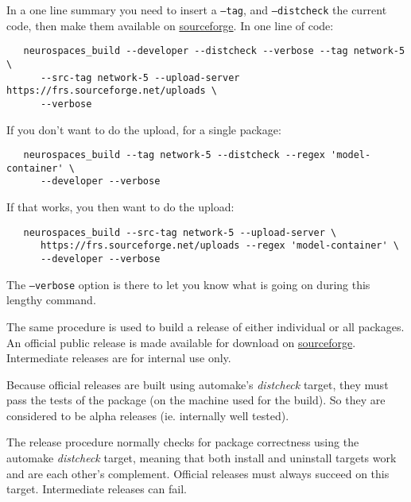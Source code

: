 \documentclass[12pt]{article}
\begin{document}
In a one line summary you need to insert a {\tt --tag}, and {\tt --distcheck} the current code, then make them available on \href{http://sourceforge.net/projects/neurospaces/}{sourceforge}. In one line of code:
\begin{verbatim}
   neurospaces_build --developer --distcheck --verbose --tag network-5 \
      --src-tag network-5 --upload-server https://frs.sourceforge.net/uploads \
      --verbose
\end{verbatim}
If you don't want to do the upload, for a single package:
\begin{verbatim}
   neurospaces_build --tag network-5 --distcheck --regex 'model-container' \
      --developer --verbose
\end{verbatim}
If that works, you then want to do the upload:
\begin{verbatim}
   neurospaces_build --src-tag network-5 --upload-server \
      https://frs.sourceforge.net/uploads --regex 'model-container' \
      --developer --verbose
\end{verbatim}
The {\tt --verbose} option is there to let you know what is going on during this lengthy command.

The same procedure is used to build a release of either individual or all packages. An official public release is made available for download on \href{http://sourceforge.net/projects/neurospaces/}{sourceforge}. Intermediate releases are for internal use only.

Because official releases are built using automake's {\it distcheck} target, they must pass the tests of the package (on the machine used for the build). So they are considered to be alpha releases (ie. internally well tested).

The release procedure normally checks for package correctness using the automake {\it distcheck} target, meaning that both install and uninstall targets work and are each other's complement. Official releases must always succeed on this target. Intermediate releases can fail.
\end{document}
